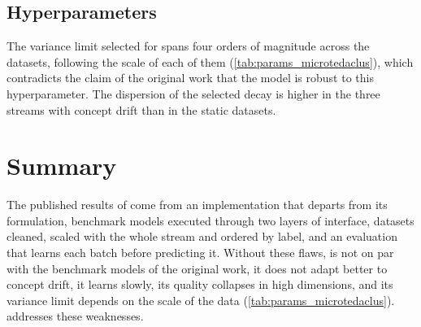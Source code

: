 \subsection{Hyperparameters}
\label{sec:parameter_variability}



The variance limit selected for \MicroTEDAClus spans four orders of magnitude across the datasets, following the scale of each of them (\cref{tab:params_microtedaclus}), which contradicts the claim of the original work that the model is robust to this hyperparameter. The dispersion of the selected decay is higher in the three streams with concept drift than in the static datasets.

\section{Summary}
\label{sec:reassessment_summary}

The published results of \MicroTEDAClus come from an implementation that departs from its formulation, benchmark models executed through two layers of interface, datasets cleaned, scaled with the whole stream and ordered by label, and an evaluation that learns each batch before predicting it. Without these flaws, \MicroTEDAClus is not on par with the benchmark models of the original work, it does not adapt better to concept drift, it learns slowly, its quality collapses in high dimensions, and its variance limit depends on the scale of the data (\cref{tab:params_microtedaclus}).  addresses these weaknesses.

\clearpage
